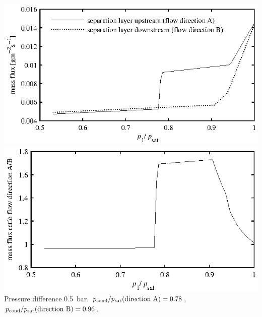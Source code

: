 \documentclass{minimal}
\begin{document}
\raggedright\noindent
\includegraphics{figure1.eps}
\includegraphics{figure2.eps}\\
Pressure difference 0.5~bar.
$p_\mathrm{cond}/p_\mathrm{sat}(\hbox{direction A}) = 0.78$,
$p_\mathrm{cond}/p_\mathrm{sat}(\hbox{direction B}) = 0.96$.\bigskip
\end{document}
